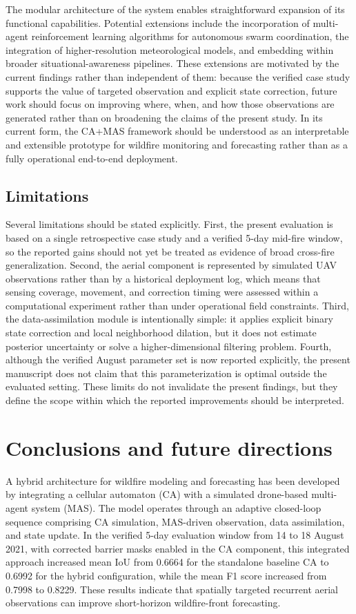 \documentclass[10pt,letterpaper]{article}
\begin{document}
The modular architecture of the system enables straightforward expansion
of its functional capabilities. Potential extensions include the
incorporation of multi-agent reinforcement learning algorithms for
autonomous swarm coordination, the integration of higher-resolution
meteorological models, and embedding within broader
situational-awareness pipelines. These extensions are motivated by the
current findings rather than independent of them: because the verified
case study supports the value of targeted observation and explicit state
correction, future work should focus on improving where, when, and how
those observations are generated rather than on broadening the claims of
the present study. In its current form, the CA+MAS framework should be
understood as an interpretable and extensible prototype for wildfire
monitoring and forecasting rather than as a fully operational end-to-end
deployment.

\subsection*{Limitations}

Several limitations should be stated explicitly. First, the present
evaluation is based on a single retrospective case study and a verified
5-day mid-fire window, so the reported gains should not yet be treated
as evidence of broad cross-fire generalization. Second, the aerial
component is represented by simulated UAV observations rather than by a
historical deployment log, which means that sensing coverage, movement,
and correction timing were assessed within a computational experiment
rather than under operational field constraints. Third, the
data-assimilation module is intentionally simple: it applies explicit
binary state correction and local neighborhood dilation, but it does not
estimate posterior uncertainty or solve a higher-dimensional filtering
problem. Fourth, although the verified August parameter set is now
reported explicitly, the present manuscript does not claim that this
parameterization is optimal outside the evaluated setting. These limits
do not invalidate the present findings, but they define the scope within
which the reported improvements should be interpreted.

\section*{Conclusions and future directions}

A hybrid architecture for wildfire modeling and forecasting has been
developed by integrating a cellular automaton (CA) with a simulated
drone-based multi-agent system (MAS). The model operates through an adaptive
closed-loop sequence comprising CA simulation, MAS-driven observation,
data assimilation, and state update. In the verified 5-day evaluation
window from 14 to 18 August 2021, with corrected barrier masks enabled
in the CA component, this integrated approach increased mean IoU from
0.6664 for the standalone baseline CA to 0.6992 for the hybrid
configuration, while the mean F1 score increased from 0.7998 to 0.8229.
These results indicate that spatially targeted recurrent aerial
observations can improve short-horizon wildfire-front forecasting.
\end{document}
